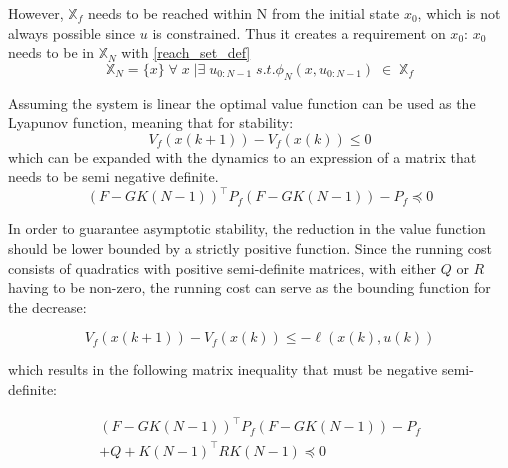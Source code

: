 However, $\mathbb{X}_f$ needs to be reached within N from the initial state $x_0$, which is not always possible since $u$ is constrained. Thus it creates a requirement on $x_0$: $x_0$ needs to be in  $\mathbb{X}_N$ with \autoref{reach_set_def}
\begin{equation}\label{reach_set_def}
    \mathbb{X}_N = \{ x\} \; \forall \; x \; | \exists \; u_{0:N-1} \; s.t. \phi_N(x, u_{0:N-1}) \; \in  \; \mathbb{X}_f
\end{equation}

Assuming the system is linear the optimal value function can be used as the Lyapunov function, meaning that for stability:
\begin{equation}
    V_f(x(k+1)) - V_f(x(k)) \le 0
\end{equation}
which can be expanded with the dynamics to an expression of a matrix that needs to be semi negative definite. 
\begin{equation}
    (F - G K(N{-}1))^\top P_f (F - G K(N{-}1)) - P_f \preceq 0
\end{equation}

In order to guarantee asymptotic stability, the reduction in the value function should be lower bounded by a strictly positive function. Since the running cost consists of quadratics with positive semi-definite matrices, with either $Q$ or $R$ having to be non-zero, the running cost can serve as the bounding function for the decrease:

\begin{equation}
    V_f(x(k{+}1)) - V_f(x(k)) \le -\ell(x(k), u(k))
\end{equation}

which results in the following matrix inequality that must be negative semi-definite:

\begin{align} \label{stab_condP}
    (F - G K(N{-}1))^\top P_f (F - G K(N{-}1)) - P_f \\
    + Q + K(N{-}1)^\top R K(N{-}1) \preceq 0
\end{align}


